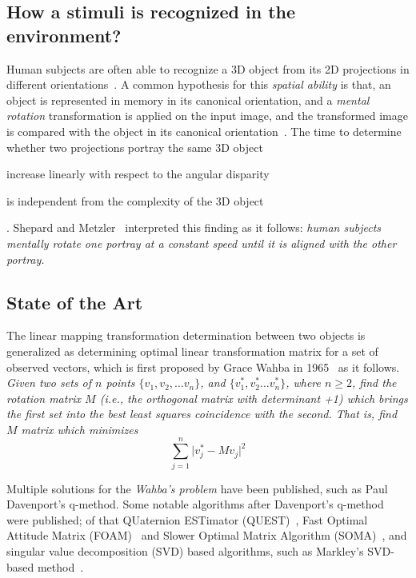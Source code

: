 \subsection{How a stimuli is recognized in the environment?}

Human subjects are often able to recognize a 3D object from its 2D projections in different orientations~\cite{bartoshuk1960mental}. A common hypothesis for this \textit{spatial ability} is that, an object is represented in memory in its canonical orientation, and a \textit{mental rotation} transformation is applied on the input image, and the transformed image is compared with the object in its canonical orientation~\cite{bartoshuk1960mental}. The time to determine whether two projections portray the same 3D object
\begin{inlinelist}
	\item increase linearly with respect to the angular disparity~\cite{bartoshuk1960mental,cooperau1973time,cooper1976demonstration}
	\item is independent from the complexity of the 3D object~\cite{cooper1973chronometric}
\end{inlinelist}.
Shepard and Metzler~\cite{shepard1971mental} interpreted this finding as it follows: \textit{human subjects mentally rotate one portray at a constant speed until it is aligned with the other portray.}



\subsection{State of the Art}

The linear mapping transformation determination between two objects is generalized as determining optimal linear transformation matrix for a set of observed vectors, which is first proposed by Grace Wahba in 1965~\cite{wahba1965least} as it follows. 
\textit{Given two sets of $n$ points $\{v_1, v_2, \dots v_n\}$, and $\{v_1^*, v_2^* \dots v_n^*\}$, where $n \geq 2$, find the rotation matrix $M$ (i.e., the orthogonal matrix with determinant +1) which brings the first set into the best least squares coincidence with the second. That is, find $M$ matrix which minimizes}
\begin{equation}
	\sum_{j=1}^{n} \vert v_j^* - Mv_j \vert^2
\end{equation}

Multiple solutions for the \textit{Wahba's problem} have been published, such as Paul Davenport's q-method. Some notable algorithms after Davenport's q-method were published; of that QUaternion ESTimator (QU\-EST)~\cite{shuster2012three}, Fast Optimal Attitude Matrix \-(FOAM)~\cite{markley1993attitude} and Slower Optimal Matrix Algorithm (SOMA)~\cite{markley1993attitude}, and singular value decomposition (SVD) based algorithms, such as Markley’s SVD-based method~\cite{markley1988attitude}. 

